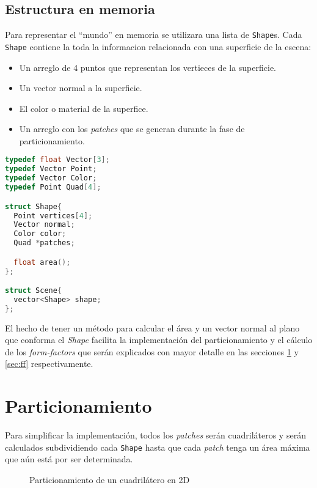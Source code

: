 \documentclass[letterpaper]{article}
\begin{document}
\subsection{Estructura en memoria}
Para representar el ``mundo'' en memoria se utilizara una lista de
\texttt{Shape}s. Cada \texttt{Shape} contiene la toda la informacion
relacionada con una superficie de la escena:
\begin{itemize}
\item Un arreglo de 4 puntos que representan los vertieces de la superficie.
\item Un vector normal a la superficie.
\item El color  o material de la superfice.
\item Un arreglo con los \textsl{patches} que se generan durante la fase de
  particionamiento.
\end{itemize}

\begin{minipage}[c]{0.5\linewidth}
\begin{lstlisting}[language=C++,frame=single,caption=Representación básica del modelo]
typedef float Vector[3]; 
typedef Vector Point;
typedef Vector Color;
typedef Point Quad[4];

struct Shape{
  Point vertices[4];
  Vector normal;
  Color color;
  Quad *patches;

  float area();
};

struct Scene{
  vector<Shape> shape;
};
\end{lstlisting}
\end{minipage}

El hecho de tener un método para calcular el área y un vector normal
al plano que conforma el {\em Shape} facilita la implementación del
particionamiento y el cálculo de los \textsl{form-factors} que serán
explicados con mayor detalle en las secciones \ref{sec:part} y
\ref{sec:ff} respectivamente.

\section{Particionamiento}
\label{sec:part}
Para simplificar la implementación, todos los \textsl{patches} serán
cuadriláteros y serán calculados subdividiendo cada \texttt{Shape}
hasta que cada \textsl{patch} tenga un área máxima que aún está por
ser determinada.

\begin{figure}[htbp]
  \centering
  
  \caption{Particionamiento de un cuadrilátero en 2D}
  \label{fig:part}
\end{figure}
\end{document}
